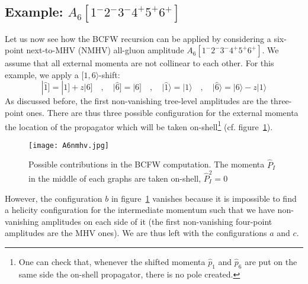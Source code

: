 \subsection{Example: $A_6[1^-2^-3^-4^+5^+6^+]$}
Let us now see how the BCFW recursion can be applied by considering a six-point next-to-MHV (NMHV) all-gluon amplitude $A_6[1^-2^-3^-4^+5^+6^+]$.
We assume that all external momenta are not collinear to each other.
For this example, we apply a $[1,6\rangle$-shift:
\begin{equation}
|\hat{1}] = |1] + z|6]
\quad,\quad
|\hat{6}] = |6]
\quad,\quad
|\hat{1}\rangle = |1\rangle
\quad,\quad
|\hat{6}\rangle = |6\rangle - z|1\rangle
\end{equation}
As discussed before, the first non-vanishing tree-level amplitudes are the three-point ones. 
There are thus three possible configuration for the external momenta \wrt the location of the propagator which will be taken on-shell\footnote{One can check that, whenever the shifted momenta $\hat{p}_1$ and $\hat{p}_6$ are put on the same side \wrt the on-shell propagator, there is no pole created.} (cf. figure~\ref{fig_A6nmhv}).
\begin{figure}[h]
  \centering
  \texttt{[image: A6nmhv.jpg]}
  \caption{Possible contributions in the BCFW computation. The momenta $\hat{P}_I$ in the middle of each graphs are taken on-shell, \ie $\hat{P}_I^2=0$}
  \label{fig_A6nmhv}
\end{figure}
However, the configuration $b$ in figure~\ref{fig_A6nmhv} vanishes because it is impossible to find a helicity configuration for the intermediate momentum such that we have non-vanishing amplitudes on each side of it (the first non-vanishing four-point amplitudes are the MHV ones).
We are thus left with the configurations $a$ and $c$.
%
